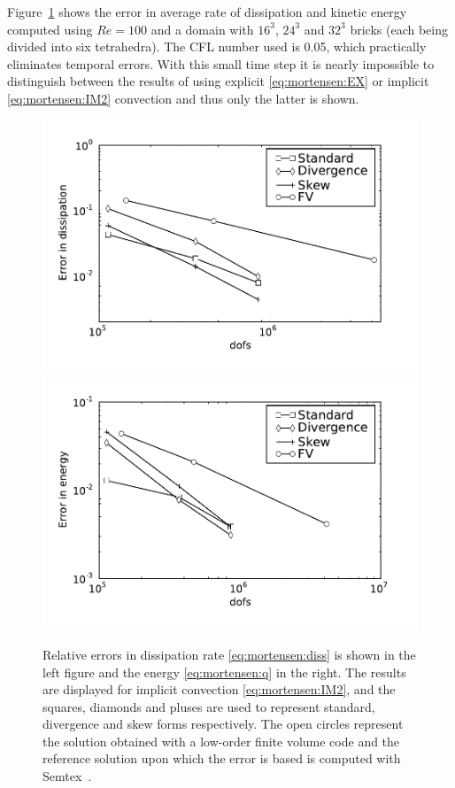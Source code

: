 Figure~\ref{fig:mortensen:dissipation} shows the error in average
rate of dissipation and kinetic energy computed using $Re=100$ and
a  domain with $16^3$, $24^3$ and $32^3$ bricks (each
being divided into six tetrahedra). The CFL number used is 0.05, which
practically eliminates temporal errors. With this small time step it is
nearly impossible to distinguish between the results of using explicit
\eqref{eq:mortensen:EX} or implicit \eqref{eq:mortensen:IM2} convection
and thus only the latter is shown.
\begin{figure}
  \centering
  \includegraphics[width=\twofigs]{chapters/mortensen/pdf/TG_disserror_model_0_cfl_0_05_Re_100_dofs.pdf}
  \includegraphics[width=\twofigs]{chapters/mortensen/pdf/TG_energyerror_model_0_cfl_0_05_Re_100_dofs.pdf}
  \caption{Relative errors in dissipation rate \eqref{eq:mortensen:diss} is
    shown in the left figure and the energy \eqref{eq:mortensen:q} in the right. The
    results are displayed for implicit convection
    \eqref{eq:mortensen:IM2}, and the squares, diamonds and pluses
    are used to represent standard, divergence and skew forms
    respectively. The open circles represent the solution obtained
    with a low-order finite volume code and the reference solution
    upon which the error is based is computed with
    Semtex~\citep{Blackburn2009}. }
  \label{fig:mortensen:dissipation}
\end{figure}

